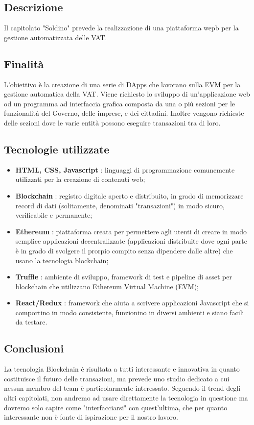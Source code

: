         \subsection{Descrizione}
            Il capitolato "Soldino" prevede la realizzazione di una piattaforma wepb per la gestione automatizzata delle VAT.
        \subsection{Finalità}
            L'obiettivo è la creazione di una serie di DApps che lavorano sulla EVM per la gestione automatica della VAT.
            Viene richiesto lo sviluppo di un'applicazione web od un programma ad interfaccia grafica composta da una o più sezioni per le funzionalità del Governo, delle imprese, e dei cittadini. Inoltre vengono richieste delle sezioni dove le varie entità possono eseguire transazioni tra di loro.
        \subsection{Tecnologie utilizzate}
            \begin{itemize}
                \item \textbf{HTML, CSS, Javascript} : linguaggi di programmazione comunemente utilizzati per la creazione di contenuti web;
                \item \textbf{Blockchain} : registro digitale aperto e distribuito, in grado di memorizzare record di dati (solitamente, denominati "transazioni") in modo sicuro, verificabile e permanente;
                \item \textbf{Ethereum} : piattaforma creata per permettere agli utenti di creare in modo semplice applicazioni decentralizzate (applicazioni distribuite dove ogni parte è in grado di svolgere il prorpio compito senza dipendere dalle altre) che usano la tecnologia blockchain;
                \item \textbf{Truffle} : ambiente di sviluppo, framework di test e pipeline di asset per blockchain che utilizzano Ethereum Virtual Machine (EVM);
                \item \textbf{React/Redux} : framework che aiuta a scrivere applicazioni Javascript che si comportino in modo consistente, funzionino in diversi ambienti e siano facili da testare.
            \end{itemize}
        \subsection{Conclusioni}
            La tecnologia Blockchain è risultata a tutti interessante e innovativa in quanto costituisce il futuro delle transazioni, ma prevede uno studio dedicato a cui nessun membro del team è particolarmente interessato. Seguendo il trend degli altri capitolati, non andremo ad usare direttamente la tecnologia in questione ma dovremo solo capire come "interfacciarsi" con quest'ultima, che per quanto interessante non è fonte di ispirazione per il nostro lavoro.
\newpage			
									
		
